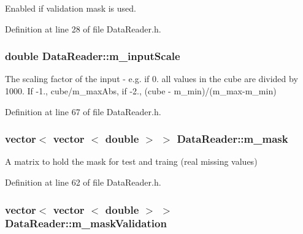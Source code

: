 Enabled if validation mask is used. 



Definition at line 28 of file Data\+Reader.\+h.

\subsubsection[{\texorpdfstring{m\+\_\+input\+Scale}{m_inputScale}}]{\setlength{\rightskip}{0pt plus 5cm}double Data\+Reader\+::m\+\_\+input\+Scale\hspace{0.3cm}{\ttfamily [private]}}\hypertarget{classDataReader_a4dbda7a5c05acd673c2188ef37913e40}{}\label{classDataReader_a4dbda7a5c05acd673c2188ef37913e40}
The scaling factor of the input -\/ e.\+g. if 0. all values in the cube are divided by 1000. If -\/1., cube/m\+\_\+max\+Abs, if -\/2., (cube -\/ m\+\_\+min)/(m\+\_\+max-\/m\+\_\+min) 

Definition at line 67 of file Data\+Reader.\+h.

\subsubsection[{\texorpdfstring{m\+\_\+mask}{m_mask}}]{\setlength{\rightskip}{0pt plus 5cm}vector$<$ vector $<$ double $>$ $>$ Data\+Reader\+::m\+\_\+mask\hspace{0.3cm}{\ttfamily [private]}}\hypertarget{classDataReader_a8eb1e7630b4efd101708fb3b5a6856c6}{}\label{classDataReader_a8eb1e7630b4efd101708fb3b5a6856c6}


A matrix to hold the mask for test and traing (real missing values) 



Definition at line 62 of file Data\+Reader.\+h.

\subsubsection[{\texorpdfstring{m\+\_\+mask\+Validation}{m_maskValidation}}]{\setlength{\rightskip}{0pt plus 5cm}vector$<$ vector $<$ double $>$ $>$ Data\+Reader\+::m\+\_\+mask\+Validation\hspace{0.3cm}{\ttfamily [private]}}\hypertarget{classDataReader_afadf320f5ab08a34b8b06c839a8192e0}{}\label{classDataReader_afadf320f5ab08a34b8b06c839a8192e0}


